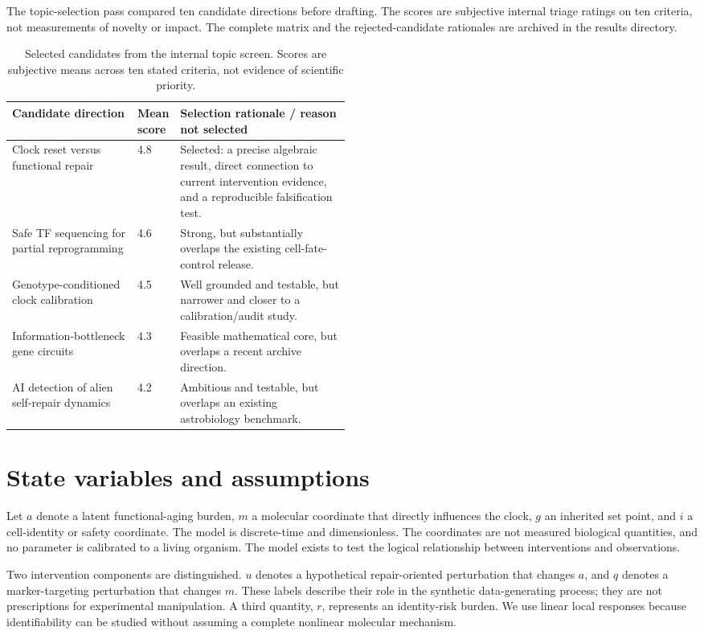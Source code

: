 \documentclass[10pt,a4paper]{article}
\begin{document}
The topic-selection pass compared ten candidate directions before drafting. The scores are subjective internal triage ratings on ten criteria, not measurements of novelty or impact. The complete matrix and the rejected-candidate rationales are archived in the results directory.

\begin{table}[!htbp]
\centering
\caption{Selected candidates from the internal topic screen. Scores are subjective means across ten stated criteria, not evidence of scientific priority.}
\label{tab:candidate-screen}
\small
\begin{tabularx}{\linewidth}{p{0.37\linewidth} p{0.12\linewidth} X}
\toprule
\textbf{Candidate direction} & \textbf{Mean score} & \textbf{Selection rationale / reason not selected} \\
\midrule
Clock reset versus functional repair & 4.8 & Selected: a precise algebraic result, direct connection to current intervention evidence, and a reproducible falsification test. \\
Safe TF sequencing for partial reprogramming & 4.6 & Strong, but substantially overlaps the existing cell-fate-control release. \\
Genotype-conditioned clock calibration & 4.5 & Well grounded and testable, but narrower and closer to a calibration/audit study. \\
Information-bottleneck gene circuits & 4.3 & Feasible mathematical core, but overlaps a recent archive direction. \\
AI detection of alien self-repair dynamics & 4.2 & Ambitious and testable, but overlaps an existing astrobiology benchmark. \\
\bottomrule
\end{tabularx}
\end{table}

\section{State variables and assumptions}
Let \(a\) denote a latent functional-aging burden, \(m\) a molecular coordinate that directly influences the clock, \(g\) an inherited set point, and \(i\) a cell-identity or safety coordinate. The model is discrete-time and dimensionless. The coordinates are not measured biological quantities, and no parameter is calibrated to a living organism. The model exists to test the logical relationship between interventions and observations.

Two intervention components are distinguished. \(u\) denotes a hypothetical repair-oriented perturbation that changes \(a\), and \(q\) denotes a marker-targeting perturbation that changes \(m\). These labels describe their role in the synthetic data-generating process; they are not prescriptions for experimental manipulation. A third quantity, \(r\), represents an identity-risk burden. We use linear local responses because identifiability can be studied without assuming a complete nonlinear molecular mechanism.
\end{document}
